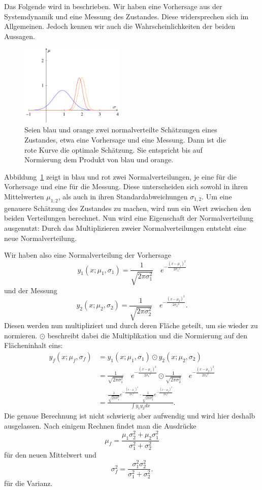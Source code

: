 Das Folgende wird in \cite{erdbeben:aragher_understanding_2012} beschrieben.
Wir haben eine Vorhersage aus der Systemdynamik und eine Messung des Zustandes.
Diese widersprechen sich im Allgemeinen. 
Jedoch kennen wir auch die Wahrscheinlichkeiten der beiden Aussagen. 

\begin{figure}
 \begin{center}
 \includegraphics[width=5cm]{papers/erdbeben/Gausskurve3.pdf}
 \caption{
    Seien blau und orange zwei normalverteilte Schätzungen eines Zustandes, etwa eine Vorhersage und eine Messung.
    Dann ist die rote Kurve die optimale Schätzung.
    Sie entspricht bis auf Normierung dem Produkt von blau und orange.}
 \label{erdbeben:Gauss3}
 \end{center}
\end{figure}
Abbildung~\ref{erdbeben:Gauss3} zeigt in blau und rot zwei Normalverteilungen,
je eine für die Vorhersage und eine für die Messung.
Diese unterscheiden sich sowohl in ihren Mittelwerten $\mu_{1,2}$, als auch in ihren Standardabweichungen $\sigma_{1,2}$.
Um eine genauere Schätzung des Zustandes zu machen, wird nun ein Wert zwischen den beiden Verteilungen berechnet. 
Nun wird eine Eigenschaft der Normalverteilung ausgenutzt:
Durch das Multiplizieren zweier Normalverteilungen entsteht eine neue Normalverteilung. 

Wir haben also eine Normalverteilung der Vorhersage
\[ 
{y_1}(x;{\mu_1},{\sigma_1})=\frac{1}{\sqrt{2\pi\sigma_1^2}}\quad e^{-\frac{(x-{\mu_1})^2}{2{\sigma_1}^2}} 
\]
und der Messung
\[ 
{y_2}(x;{\mu_2},{\sigma_2})=\frac{1}{\sqrt{2\pi\sigma_2^2}}\quad e^{-\frac{(x-{\mu_2})^2}{2{\sigma_2}^2}}.
\]
Diesen werden nun multipliziert und durch deren Fläche geteilt,
um sie wieder zu normieren.
$\odot$ beschreibt dabei die Multiplikation und die Normierung auf den Flächeninhalt eins:
\begin{align*}
	{y_f}(x; {\mu_f}, {\sigma_f}) 
	&=
	 {y_1}(x;{ \mu_1},{ \sigma_1}) \odot {y_2}(x; {\mu_2}, {\sigma_2})
	\\
	&=
	\frac{1}{\sqrt{2\pi\sigma_1^2}}\quad e^{-\frac{(x-{\mu_1})^2}{2{\sigma_1}^2}} \odot \frac{1}{\sqrt{2\pi\sigma_2^2}}\quad e^{-\frac{(x-{\mu_2})^2}{2{\sigma_2}^2}}
	\\
	&=
	\frac{ \frac{1}{\sqrt{2\pi\sigma_1^2}}e^{-\frac{(x-{\mu_1})^2}{2{\sigma_1}^2}} \cdot \frac{1}{\sqrt{2\pi\sigma_2^2}}e^{-\frac{(x-{\mu_2})^2}{2{\sigma_2}^2}}}{\int {y_1} {y_2} dx}.
\end{align*}
Die genaue Berechnung ist nicht schwierig aber aufwendig und wird hier deshalb ausgelassen.
Nach einigem Rechnen findet man die Ausdrücke
\[ \mu_f = \frac{\mu_1\sigma_2^2 + \mu_2 \sigma_1^2}{\sigma_1^2 + \sigma_2^2} \]
für den neuen Mittelwert und
\[
\sigma_f^2 = \frac{\sigma_1^2 \sigma_2^2}{\sigma_1^2 + \sigma_2^2}.
\]
für die Varianz.

